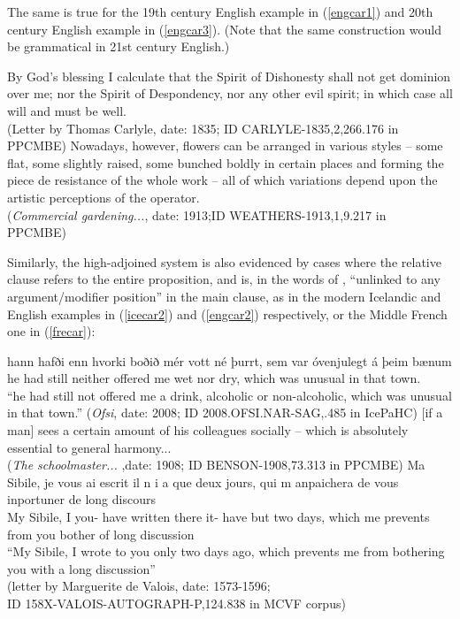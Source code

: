 \noindent The same is true for the 19th century English example in (\ref{engcar1}) and 20th century English example in (\ref{engcar3}). (Note that the same construction would be grammatical in 21st century English.)

\begin{exe}
         \ex \label{engcar1} By God's blessing I calculate that the Spirit of Dishonesty shall not get dominion over me; nor the Spirit of Despondency, nor any other evil spirit; in which case
all will and must be well.\\
(Letter by Thomas Carlyle, date: 1835; ID CARLYLE-1835,2,266.176 in PPCMBE)
        \ex \label{engcar3} Nowadays, however, flowers can be arranged in various styles -- some flat, some slightly raised, some bunched boldly in certain
places and forming the piece de resistance of
the whole work -- all of which variations depend upon the artistic
perceptions of the operator.\\
        (\textsl{Commercial gardening...}, date: 1913;ID WEATHERS-1913,1,9.217 in \\PPCMBE)
\end{exe}

\noindent Similarly, the high-adjoined system is also evidenced by cases where the relative clause refers to the entire proposition, and is, in the words of \citet[][157]{kiparsky1995}, ``unlinked to any argument/modifier position'' in the main clause, as in the modern Icelandic and English examples in (\ref{icecar2}) and (\ref{engcar2}) respectively, or the Middle French one in (\ref{frecar}):

\begin{exe}
         \ex \label{icecar2} \gll hann hafði enn hvorki boðið mér vott né þurrt, sem var óvenjulegt á þeim bænum\\
         he had still neither offered me wet nor dry, which was unusual in that town.\\
         \quad ``he had still not offered me a drink, alcoholic or non-alcoholic, which was unusual in that town.''
         (\textsl{Ofsi}, date: 2008; ID 2008.OFSI.NAR-SAG,.485 in IcePaHC)
         \ex \label{engcar2} [if a man] sees a certain amount of his colleagues socially --  which is absolutely essential to general harmony...\\
         (\textsl{The schoolmaster...} ,date: 1908; ID BENSON-1908,73.313 in PPCMBE)
         \ex \label{frecar} \gll Ma Sibile, je vous ai escrit il n i a que deux jours, qui m anpaichera de vous inportuner de long discours \\
         My Sibile, I you- have written there  it- have but two days, which me prevents from you bother of long discussion\\
         \quad ``My Sibile, I wrote to you only two days ago, which prevents me from bothering you with a long discussion''\\
         (letter by Marguerite de Valois, date: 1573-1596; \\ID 158X-VALOIS-AUTOGRAPH-P,124.838 in MCVF corpus)

\end{exe}


